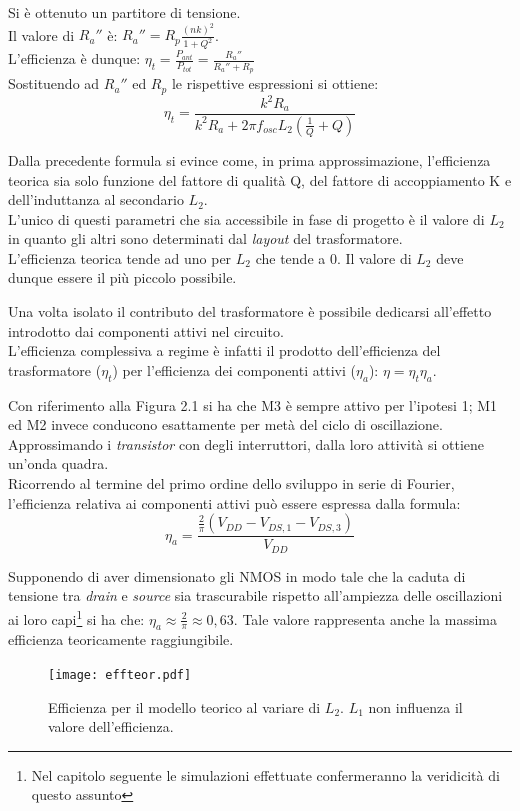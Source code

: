 \documentclass[a4paper, 12pt]{memoir}
\begin{document}
\noindent Si è ottenuto un partitore di tensione.\\
Il  valore di $ R_a'' $ è: $ R_a'' = R_p \frac{\left(nk\right)^2}{1 + Q^2} $.\\
L'efficienza è dunque:
$ \eta_t = \frac{P_{ant}}{P_{tot}} = \frac{R_a''}{R_a'' + R_p} $
\\Sostituendo ad $R_a''$ ed $R_p$ le rispettive espressioni si ottiene:
$$ \eta_t = \frac{k^2R_a}{k^2R_a + 2\pi f_{osc}L_2(\frac{1}{Q} + Q)} $$

Dalla precedente formula si evince come, in prima approssimazione, l'efficienza
teorica sia solo funzione del fattore di qualità Q, del fattore di 
accoppiamento K e dell'induttanza al secondario $L_2$.\\
L'unico di questi parametri che sia accessibile in fase di progetto è il
valore di $L_2$ in quanto  gli altri sono determinati dal \emph{layout} del
trasformatore.\\
L'efficienza teorica tende ad uno per $L_2$ che tende a 0. Il valore
di $L_2$ deve dunque essere il più piccolo possibile.

Una volta isolato il contributo del trasformatore è possibile dedicarsi 
all'effetto introdotto dai componenti attivi nel circuito.\\
L'efficienza complessiva a regime è infatti il prodotto dell'efficienza del
trasformatore ($\eta_t$) per l'efficienza dei componenti attivi ($\eta_a$):
$ \eta = \eta_t \eta_a $.

Con riferimento alla Figura 2.1 si ha che M3 è sempre attivo per l'ipotesi 1;
M1 ed M2 invece conducono esattamente per metà del ciclo di oscillazione.\\
Approssimando i \emph{transistor} con degli interruttori, dalla loro attività
si ottiene un'onda quadra.\\
Ricorrendo al termine del primo ordine dello sviluppo in serie di Fourier, 
l'efficienza relativa ai componenti attivi può essere espressa dalla formula:
\cite{Neviani14}$$ \eta_a=\frac{\frac{2}{\pi}\left(V_{DD}-V_{DS,1}-V_{DS,3}
\right)}{V_{DD}}$$

Supponendo di aver dimensionato gli NMOS in modo tale che la caduta di tensione
tra \emph{drain} e \emph{source} sia trascurabile rispetto all'ampiezza delle
oscillazioni ai loro capi\footnote{Nel capitolo seguente le simulazioni
effettuate confermeranno la veridicità di questo assunto} si ha che:  
$\eta_a \approx \frac{2}{\pi} \approx 0,63$. Tale valore rappresenta anche la
massima efficienza teoricamente raggiungibile.
\begin{figure}[h]
\centering
\texttt{[image: effteor.pdf]}
\caption{Efficienza per il modello teorico al variare di $L_2$. $ L_1 $ non
influenza il valore dell'efficienza.}
\end{figure}
\end{document}
